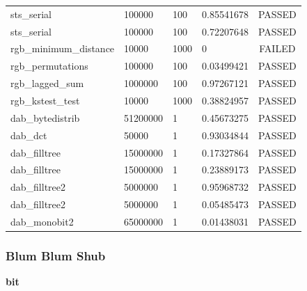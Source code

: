 \documentclass[titlepage, 11pt]{article}
\begin{document}
\begin{table}[!htb]
\begin{tabular}{l|l|l|l|c}
sts\_serial & 100000 & 100 & 0.85541678 & PASSED \\
sts\_serial & 100000 & 100 & 0.72207648 & PASSED \\
rgb\_minimum\_distance & 10000 & 1000 & 0 & FAILED \\
rgb\_permutations & 100000 & 100 & 0.03499421 & PASSED \\
rgb\_lagged\_sum & 1000000 & 100 & 0.97267121 & PASSED \\
rgb\_kstest\_test & 10000 & 1000 & 0.38824957 & PASSED \\
dab\_bytedistrib & 51200000 & 1 & 0.45673275 & PASSED \\
dab\_dct & 50000 & 1 & 0.93034844 & PASSED \\
dab\_filltree & 15000000 & 1 & 0.17327864 & PASSED \\
dab\_filltree & 15000000 & 1 & 0.23889173 & PASSED \\
dab\_filltree2 & 5000000 & 1 & 0.95968732 & PASSED \\
dab\_filltree2 & 5000000 & 1 & 0.05485473 & PASSED \\
dab\_monobit2 & 65000000 & 1 & 0.01438031 & PASSED
\end{tabular}
\end{table}


\newpage
\subsubsection{Blum Blum Shub}
\textbf{ bit}
\end{document}
